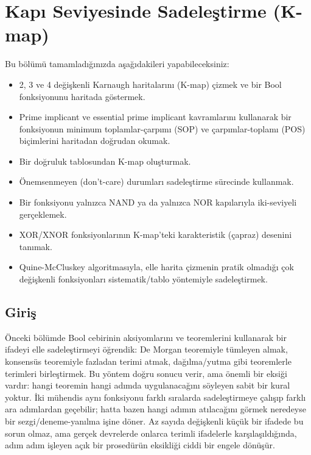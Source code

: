 ﻿%
\chapter{Kapı Seviyesinde Sadeleştirme (K-map)}
\label{chap:kmap}

\begin{tcolorbox}[
    colback=blokyesil!15,
    colframe=sinyalyesil!60!black,
    title={\textbf{Öğrenme Hedefleri}},
    fonttitle=\bfseries,
    rounded corners,
    boxrule=0.8pt
]
Bu bölümü tamamladığınızda aşağıdakileri yapabileceksiniz:
\begin{itemize}[nosep, leftmargin=*]
    \item 2, 3 ve 4 değişkenli Karnaugh haritalarını (K-map) çizmek ve bir Bool
    fonksiyonunu haritada göstermek.
    \item Prime implicant ve essential prime implicant kavramlarını kullanarak bir
    fonksiyonun minimum toplamlar-çarpımı (SOP) ve çarpımlar-toplamı (POS) biçimlerini
    haritadan doğrudan okumak.
    \item Bir doğruluk tablosundan K-map oluşturmak.
    \item Önemsenmeyen (don't-care) durumları sadeleştirme sürecinde kullanmak.
    \item Bir fonksiyonu yalnızca NAND ya da yalnızca NOR kapılarıyla iki-seviyeli
    gerçeklemek.
    \item XOR/XNOR fonksiyonlarının K-map'teki karakteristik (çapraz) desenini tanımak.
    \item Quine-McCluskey algoritmasıyla, elle harita çizmenin pratik olmadığı çok
    değişkenli fonksiyonları sistematik/tablo yöntemiyle sadeleştirmek.
\end{itemize}
\end{tcolorbox}

\section{Giriş}
\label{sec:kmap-giris}

Önceki bölümde Bool cebirinin aksiyomlarını ve teoremlerini kullanarak bir ifadeyi elle
sadeleştirmeyi öğrendik: De Morgan teoremiyle tümleyen almak, konsensüs teoremiyle fazladan
terimi atmak, dağılma/yutma gibi teoremlerle terimleri birleştirmek. Bu yöntem doğru sonucu
verir, ama önemli bir eksiği vardır: hangi teoremin hangi adımda uygulanacağını söyleyen
sabit bir kural yoktur. İki mühendis aynı fonksiyonu farklı sıralarda sadeleştirmeye
çalışıp farklı ara adımlardan geçebilir; hatta bazen hangi adımın atılacağını görmek
neredeyse bir sezgi/deneme-yanılma işine döner. Az sayıda değişkenli küçük bir ifadede bu
sorun olmaz, ama gerçek devrelerde onlarca terimli ifadelerle karşılaşıldığında, adım adım
işleyen açık bir prosedürün eksikliği ciddi bir engele dönüşür.

